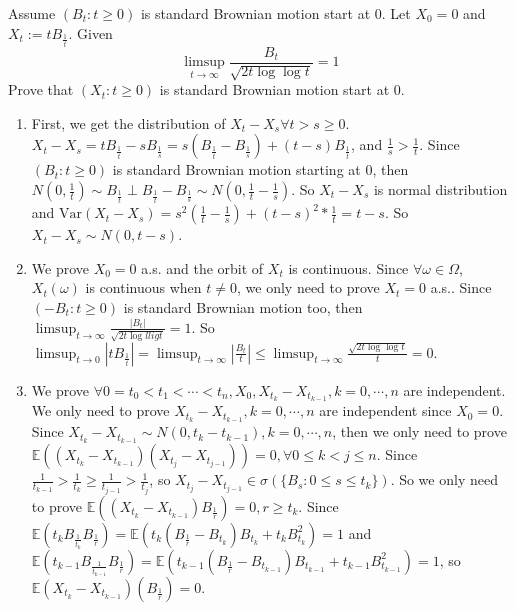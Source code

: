 \documentclass{ctexart}
\begin{document}
\begin{problem}\label{pro:4}
  Assume \((B_t:t \geq 0)\) is standard Brownian motion start at \(0\).
  Let \(X_0=0\) and \(X_t:=t B_{\frac{1}{t}}\).
  Given
  \[
    \limsup_{t \to \infty}\frac{B_{t}}{\sqrt{2t \log \log t}}=1
  \]
  Prove that \((X_t:t \geq 0)\) is standard Brownian motion start at \(0\).
\end{problem}
\begin{solution}
  \begin{enumerate}
    \item First, we get the distribution of \(X_t-X_s \forall t > s \geq0\). \(X_t-X_s=t B_{\frac{1}{t}}-s B_{\frac{1}{s}}=s(B_{\frac{1}{t}}-B_{\frac{1}{s}})+(t-s)B_{\frac{1}{t}}\),
      and \(\frac{1}{s} > \frac{1}{t}\). Since \((B_t:t \geq 0)\) is standard Brownian motion starting at 0, then \(N(0, \frac{1}{t})\sim B_{\frac{1}{t}} \perp B_{\frac{1}{t}} - B_{\frac{1}{s}}\sim N(0,\frac{1}{t }-\frac{1}{s})\).
      So \(X_t-X_s\) is normal distribution and \(\mathrm{Var}(X_t-X_s)=s^2(\frac{1}{t}-\frac{1}{s}) + (t-s)^2*\frac{1}{t}=t-s\).
      So \(X_t-X_s \sim N(0, t-s)\).
    \item We prove \(X_0=0\) a.s. and the orbit of \(X_t\) is continuous.
      Since \(\forall \omega \in \Omega\), \(X_t(\omega)\) is continuous when \(t \neq 0\), we only need to prove \(X_t=0\) a.s..
      Since \((-B_t: t \geq 0)\) is standard Brownian motion too, then \(\limsup_{t \to \infty} \frac{|B_t|}{\sqrt{2t \log llig t}}=1\).
      So \(\limsup_{t \to 0}|tB_{\frac{1}{t}}|= \limsup_{t \to \infty} |\frac{B_t}{t}| \leq \limsup_{t \to \infty} \frac{\sqrt{2t \log \log t}}{t}=0\).
    \item We prove \(\forall 0=t_0 < t_1 <\cdots<t_n, X_0, X_{t_k}-X_{t_{k-1}}, k=0,\cdots,n\) are independent.
      We only need to prove \(X_{t_k}-X_{t_{k-1}}, k=0,\cdots,n\) are independent since \(X_0=0\).
      Since \(X_{t_k}-X_{t_{k-1}} \sim N(0, t_k-t_{k-1}), k=0,\cdots,n\),
      then we only need to prove \(\mathbb{E}((X_{t_k}-X_{t_{k-1}})(X_{t_j}-X_{t_{j-1}}))=0, \forall 0 \leq k<j \leq n\).
      Since \(\frac{1}{t_{k-1}} > \frac{1}{t_k} \geq \frac{1}{t_{j-1}}> \frac{1}{t_j}\), so \(X_{t_j}-X_{t_{j-1}} \in \sigma(\{B_{s}:0 \leq s \leq t_{k}\})\).
      So we only need to prove \(\mathbb{E}((X_{t_k}-X_{t_{k-1}})B_{\frac{1}{r}})=0, r \geq t_{k}\).
      Since \(\mathbb{E}(t_kB_{\frac{1}{t_k}}B_{\frac{1}{r}})=\mathbb{E}(t_k(B_{\frac{1}{r}}-B_{t_k})B_{t_k} + t_kB_{t_k}^2)=1\)
      and \(\mathbb{E}(t_{k-1}B_{\frac{1}{t_{k-1}}}B_{\frac{1}{r}})=\mathbb{E}(t_{k-1}(B_{\frac{1}{r}}-B_{t_{k-1}})B_{t_{k-1}} + t_{k-1}B_{t_{k-1}}^2)=1\),
      so \(\mathbb{E}(X_{t_k}-X_{t_{k-1}})(B_{\frac{1}{r}})=0\).
  \end{enumerate}

\end{solution}
\end{document}
